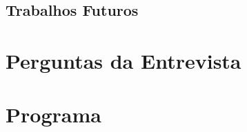 \documentclass[openright]{normas-utf-tex} %
\begin{document}
	\section{Trabalhos Futuros}
		

\clearpage %
\label{bibstart}
\label{bibend}

\apendice
\chapter{Perguntas da Entrevista}
\label{pergent}


\chapter{Programa}
\label{program}

\end{document}

